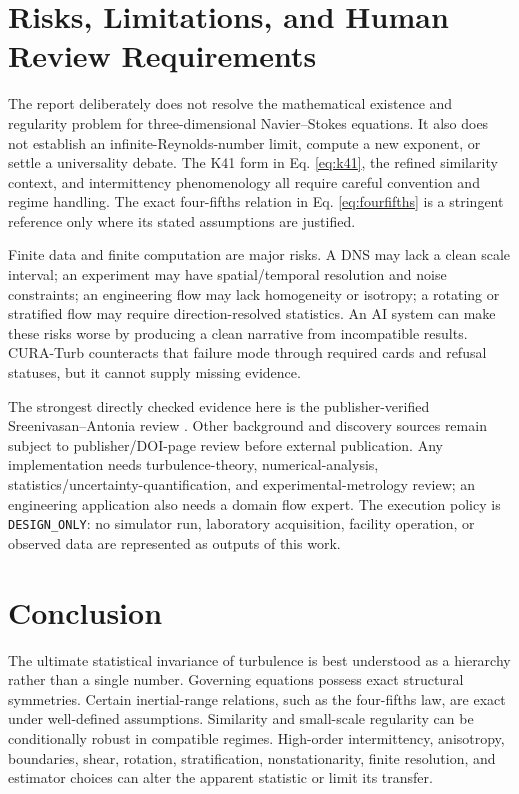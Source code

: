 \documentclass[conference]{../../../../Conference-LaTeX-template_10-17-19/IEEEtran}
\begin{document}
\section{Risks, Limitations, and Human Review Requirements}
The report deliberately does not resolve the mathematical existence and regularity problem for three-dimensional Navier--Stokes equations. It also does not establish an infinite-Reynolds-number limit, compute a new exponent, or settle a universality debate. The K41 form in Eq. \eqref{eq:k41}, the refined similarity context, and intermittency phenomenology all require careful convention and regime handling. The exact four-fifths relation in Eq. \eqref{eq:fourfifths} is a stringent reference only where its stated assumptions are justified.

Finite data and finite computation are major risks. A DNS may lack a clean scale interval; an experiment may have spatial/temporal resolution and noise constraints; an engineering flow may lack homogeneity or isotropy; a rotating or stratified flow may require direction-resolved statistics. An AI system can make these risks worse by producing a clean narrative from incompatible results. CURA-Turb counteracts that failure mode through required cards and refusal statuses, but it cannot supply missing evidence.

The strongest directly checked evidence here is the publisher-verified Sreenivasan--Antonia review \cite{sreenivasan_antonia_1997}. Other background and discovery sources remain subject to publisher/DOI-page review before external publication. Any implementation needs turbulence-theory, numerical-analysis, statistics/uncertainty-quantification, and experimental-metrology review; an engineering application also needs a domain flow expert. The execution policy is \texttt{DESIGN\_ONLY}: no simulator run, laboratory acquisition, facility operation, or observed data are represented as outputs of this work.

\section{Conclusion}
The ultimate statistical invariance of turbulence is best understood as a hierarchy rather than a single number. Governing equations possess exact structural symmetries. Certain inertial-range relations, such as the four-fifths law, are exact under well-defined assumptions. Similarity and small-scale regularity can be conditionally robust in compatible regimes. High-order intermittency, anisotropy, boundaries, shear, rotation, stratification, nonstationarity, finite resolution, and estimator choices can alter the apparent statistic or limit its transfer.
\end{document}
